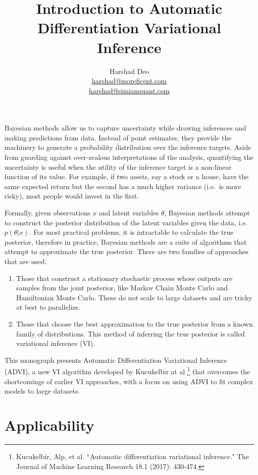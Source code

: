 \documentclass[10pt]{article}
\title{Introduction to Automatic Differentiation Variational Inference}
\author{Harshad Deo \\ 
  \href{mailto:harshad@moreficent.com}{harshad@moreficent.com} \\ 
  \href{mailto:harshad@simianquant.com}{harshad@simianquant.com}
}
\date{}
\begin{document}
  
\maketitle

Bayesian methods allow us to capture uncertainty while drawing inferences and making predictions from data. Instead of 
point estimates, they provide the machinery to generate a probability distribution over the inference targets. Aside from 
guarding against over-zealous interpretations of the analysis, quantifying the uncertainty is useful when the utility of 
the inference target is a non-linear function of its value. For example, if two assets, say a stock or a house, have the
same expected return but the second has a much higher variance (i.e.\ is more risky), most people would invest in the 
first. 

Formally, given observations $x$ and latent variables $\theta$, Bayesian methods attempt to construct the posterior 
distribution of the latent variables given the data, i.e.\ $p(\theta|x)$. For most practical problems, it is intractable 
to calculate the true posterior, therefore in practice, Bayesian methods are a suite of algorithms that attempt to 
approximate the true posterior. There are two families of approaches that are used:

\begin{enumerate}
  \item Those that construct a stationary stochastic process whose outputs are samples from the joint posterior, like 
    Markov Chain Monte Carlo and Hamiltonian Monte Carlo. These do not scale to large datasets and are tricky at 
    best to parallelize.
  \item Those that choose the best approximation to the true posterior from a known family of distributions. This method 
    of inferring the true posterior is called variational inference (VI).
\end{enumerate}

This monograph presents Automatic Differentiation Variational Inference (ADVI), a new VI algorithm
developed by Kucukelbir at al \footnote{Kucukelbir, Alp, et al. ``Automatic differentiation variational inference." 
The Journal of Machine Learning Research 18.1 (2017): 430-474.} that overcomes the shortcomings of earlier VI approaches,
with a focus on using ADVI to fit complex models to large datasets. 

\section*{Applicability}
\end{document}

